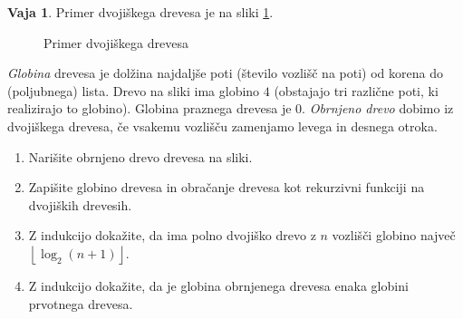 \documentclass{article}
\theoremstyle{definition}
\newtheorem{vaja}{Vaja}
\begin{document}
\begin{vaja}
	Primer dvojiškega drevesa je na sliki \ref{fig:drevo}.

	\begin{figure}
		\centering
		\caption{Primer dvojiškega drevesa}
		\label{fig:drevo}
	\end{figure}


	
	
	\emph{Globina} drevesa je dolžina najdaljše poti (število vozlišč na poti) od korena do (poljubnega) lista. Drevo na sliki ima globino $4$ (obstajajo tri različne poti, ki realizirajo to globino). Globina praznega drevesa je 0.  
	\emph{Obrnjeno drevo} dobimo iz dvojiškega drevesa, če vsakemu vozlišču zamenjamo levega in desnega otroka. 
	\begin{enumerate}
		\item Narišite obrnjeno drevo drevesa na sliki.
		\item Zapišite globino drevesa in obračanje drevesa kot rekurzivni funkciji na dvojiških drevesih.
		\item Z indukcijo dokažite, da ima polno dvojiško drevo z $n$ vozlišči globino največ $\left \lfloor{ \log_2(n + 1)}\right \rfloor $. 
		\item Z indukcijo dokažite, da je globina obrnjenega drevesa enaka globini prvotnega drevesa. 
	\end{enumerate}
\end{vaja}
\end{document}
